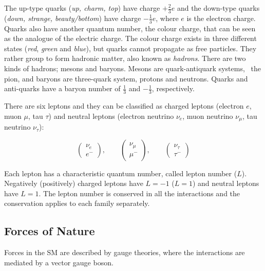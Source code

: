 			\noindent The up-type quarks (\textit{up, charm, top}) have charge $+\frac{2}{3}e$ and the down-type quarks (\textit{down, strange, beauty/bottom}) have charge $-\frac{1}{3}e$, where $e$ is the electron charge. Quarks also have another quantum number, the colour charge, that can be seen as the analogue of the electric charge. The colour charge exists in three different states (\textit{red}, \textit{green} and \textit{blue}), but quarks cannot propagate as free particles. They rather group to form hadronic matter, also known as \emph{hadrons}. There are two kinds of hadrons; mesons and baryons. Mesons are quark-antiquark systems, \eg\ the pion, and baryons are three-quark system, \eg protons and neutrons. Quarks and anti-quarks have a baryon number of $\frac{1}{3}$ and $-\frac{1}{3}$, respectively.

			There are six leptons and they can be classified as charged leptons (electron $e$, muon $\mu$, tau $\tau$) and neutral leptons (electron neutrino $\nu_e$, muon neutrino $\nu_{\mu}$, tau neutrino $\nu_{\tau}$):
			
			\begin{equation*}
			\label{eq:lepton_flavor_doublets}
				\begin{pmatrix} \nu_e      \\ e^-    \end{pmatrix}, \qquad
				\begin{pmatrix} \nu_{\mu}  \\ \mu^-  \end{pmatrix}, \qquad
				\begin{pmatrix} \nu_{\tau} \\ \tau^- \end{pmatrix}
			\end{equation*}

			\noindent Each lepton has a characteristic quantum number, called lepton number ($L$). Negatively (positively) charged leptons have $L=-1$ ($L=1$) and neutral leptons have $L=1$. The lepton number is conserved in all the interactions and the conservation applies to each family separately.



		\subsection*{Forces of Nature}

			Forces in the \ac{SM} are described by gauge theories, where the interactions are mediated by a vector gauge boson. 

